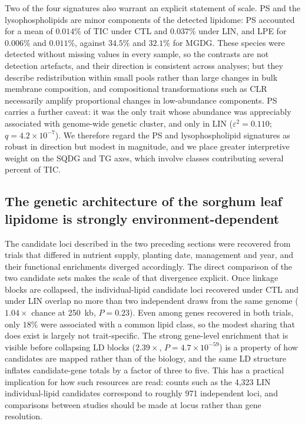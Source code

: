 Two of the four signatures also warrant an explicit statement of scale. PS and the lysophospholipids are minor components of the detected lipidome: PS accounted for a mean of $0.014\%$ of TIC under CTL and $0.037\%$ under LIN, and LPE for $0.006\%$ and $0.011\%$, against $34.5\%$ and $32.1\%$ for MGDG. These species were detected without missing values in every sample, so the contrasts are not detection artefacts, and their direction is consistent across analyses; but they describe redistribution within small pools rather than large changes in bulk membrane composition, and compositional transformations such as CLR necessarily amplify proportional changes in low-abundance components. PS carries a further caveat: it was the only trait whose abundance was appreciably associated with genome-wide genetic cluster, and only in LIN ($\varepsilon^2=0.110$; $q=4.2\times10^{-7}$). We therefore regard the PS and lysophospholipid signatures as robust in direction but modest in magnitude, and we place greater interpretive weight on the SQDG and TG axes, which involve classes contributing several percent of TIC.



\subsection{The genetic architecture of the sorghum leaf lipidome is strongly environment-dependent}

The candidate loci described in the two preceding sections were recovered from trials that differed in nutrient supply, planting date, management and year, and their functional enrichments diverged accordingly. The direct comparison of the two candidate sets makes the scale of that divergence explicit. Once linkage blocks are collapsed, the individual-lipid candidate loci recovered under CTL and under LIN overlap no more than two independent draws from the same genome ($1.04\times$ chance at 250~kb, $P=0.23$). Even among genes recovered in both trials, only $18\%$ were associated with a common lipid class, so the modest sharing that does exist is largely not trait-specific. The strong gene-level enrichment that is visible before collapsing LD blocks ($2.39\times$, $P=4.7\times10^{-59}$) is a property of how candidates are mapped rather than of the biology, and the same LD structure inflates candidate-gene totals by a factor of three to five. This has a practical implication for how such resources are read: counts such as the 4{,}323 LIN individual-lipid candidates correspond to roughly 971 independent loci, and comparisons between studies should be made at locus rather than gene resolution.

